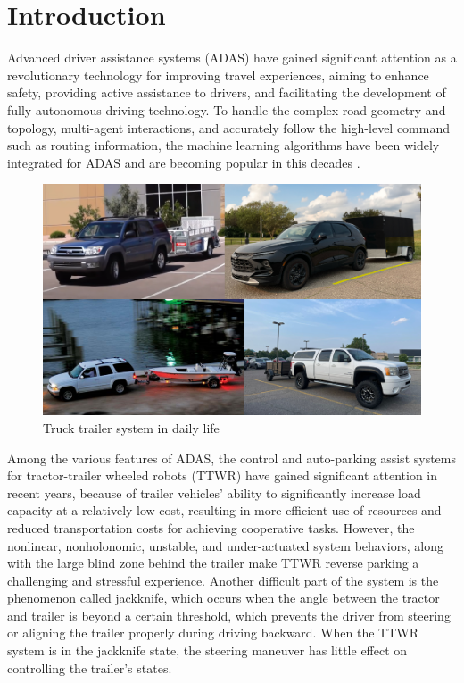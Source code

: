 \chapter{\leavevmode\newline Introduction}
\label{chap:Introduction}

Advanced driver assistance systems (ADAS) have gained significant attention as a revolutionary technology for improving travel experiences, aiming to enhance safety, providing active assistance to drivers, and facilitating the development of fully autonomous driving technology. To handle the complex road geometry and topology, multi-agent interactions, and accurately follow the high-level command such as routing information, the machine learning algorithms have been widely integrated for ADAS and are becoming popular in this decades \parencite{chen2019model} \parencite{shaout2022adas}.

\begin{figure}[h]
\centering
\includegraphics[scale=0.5]{fig/trailer_parking_real_world_all.png}
\caption{Truck trailer system in daily life}
\label{fig: real world trailer parking}
\end{figure}

Among the various features of ADAS, the control and auto-parking assist systems for tractor-trailer wheeled robots (TTWR) have gained significant attention in recent years, because of trailer vehicles' ability to significantly increase load capacity at a relatively low cost, resulting in more efficient use of resources and reduced transportation costs for achieving cooperative tasks\parencite{liu2022review}. However, the nonlinear, nonholonomic, unstable, and under-actuated system behaviors, along with the large blind zone behind the trailer make TTWR reverse parking a challenging and stressful experience. Another difficult part of the system is the phenomenon called jackknife, which occurs when the angle between the tractor and trailer is beyond a certain threshold, which prevents the driver from steering or aligning the trailer properly during driving backward. When the TTWR system is in the jackknife state, the steering maneuver has little effect on controlling the trailer's states.


